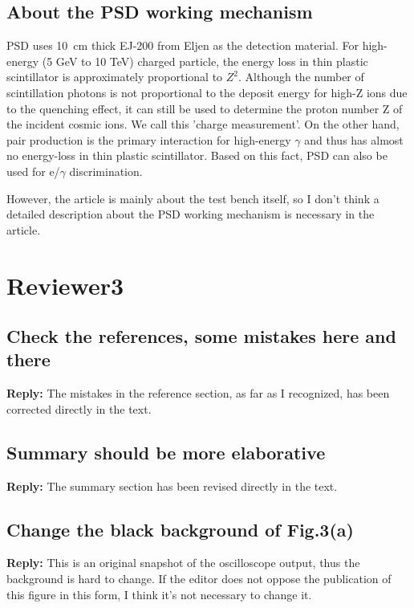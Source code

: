 \documentclass[]{article}
\begin{document}
\subsection{About the PSD working mechanism}
PSD uses \SI{10}{\centi\meter} thick EJ-200 from Eljen as the detection material. For high-energy (5 GeV to 10 TeV) charged particle, the energy loss in thin plastic scintillator is approximately proportional to $Z^2$. Although the number of scintillation photons is not proportional to the deposit energy for high-Z ions due to the quenching effect, it can still be used to determine the proton number Z of the incident cosmic ions. We call this 'charge measurement'. On the other hand, pair production is the primary interaction for high-energy $\gamma$ and thus has almost no energy-loss in thin plastic scintillator. Based on this fact, PSD can also be used for e/$\gamma$ discrimination. 

However, the article is mainly about the test bench itself, so I don't think a detailed description about the PSD working mechanism is necessary in the article. 

\section{Reviewer3}
\subsection{Check the references, some mistakes here and there}
\textbf{Reply:}\newline
The mistakes in the reference section, as far as I recognized, has been corrected directly in the text.

\subsection{Summary should be more elaborative}
\textbf{Reply:}\newline
The summary section has been revised directly in the text.

\subsection{Change the black background of Fig.3(a)}
\textbf{Reply:}\newline
This is an original snapshot of the oscilloscope output, thus the background is hard to change. If the editor does not oppose the publication of this figure in this form, I think it's not necessary to change it.
\end{document}
